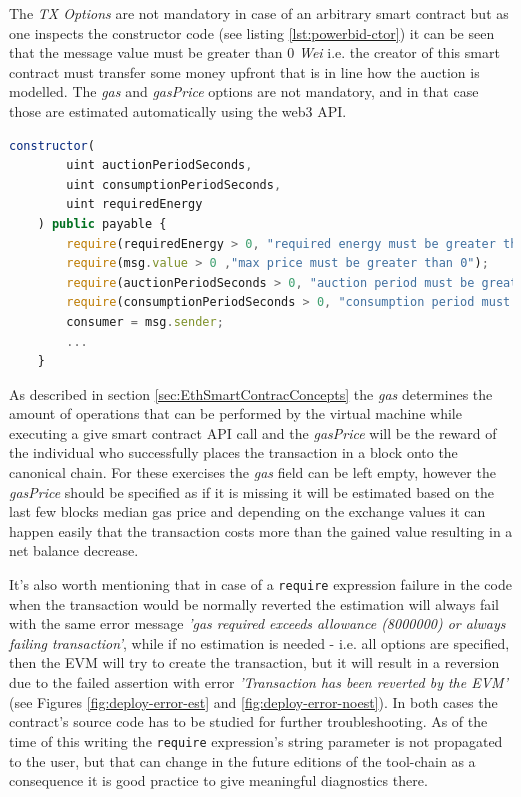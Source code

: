 \documentclass[a4paper]{article}
\begin{document}
The \emph{TX Options} are not mandatory in case of an arbitrary smart contract but as one inspects the constructor code (see listing \ref{lst:powerbid-ctor}) it can be seen that  the message value must be greater than 0 \emph{Wei} i.e. the creator of this smart contract must transfer some money upfront that is in line how the auction is modelled. The \emph{gas} and \emph{gasPrice} options are not mandatory, and in that case those are estimated automatically using the web3 API. 

\begin{lstlisting}[language=javascript,caption={Excerpt from the constructor of the Powerbid smart contract},label={lst:powerbid-ctor}]
    constructor(
        uint auctionPeriodSeconds,
        uint consumptionPeriodSeconds,
        uint requiredEnergy
    ) public payable {
        require(requiredEnergy > 0, "required energy must be greater than 0 wh");
        require(msg.value > 0 ,"max price must be greater than 0");
        require(auctionPeriodSeconds > 0, "auction period must be greater than 0");
        require(consumptionPeriodSeconds > 0, "consumption period must be greater than 0");
        consumer = msg.sender;
        ...
    }
\end{lstlisting}

As described in section \ref{sec:EthSmartContracConcepts} the \emph{gas} determines the amount of operations that can be performed by the virtual machine while executing a give smart contract API call and the \emph{gasPrice} will be the reward of the individual who successfully places the transaction in a block onto the canonical chain. For these exercises the \emph{gas} field can be left empty, however the \emph{gasPrice} should be specified as if it is missing it will be estimated based on the last few blocks median gas price and depending on the exchange values it can happen easily that the transaction costs more than the gained value resulting in a net balance decrease.

It's also worth mentioning that in case of a \verb!require! expression failure in the code when the transaction would be normally reverted the estimation will always fail with the same error message \emph{'gas required exceeds allowance (8000000) or always failing transaction'}, while if no estimation is needed - i.e. all options are specified, then the EVM will try to create the transaction, but it will result in a reversion due to the failed assertion with error \emph{'Transaction has been reverted by the EVM'} (see Figures \ref{fig:deploy-error-est} and \ref{fig:deploy-error-noest}). In both cases the contract's source code has to be studied for further troubleshooting. As of the time of this writing the \verb!require! expression's string parameter is not propagated to the user, but that can change in the future editions of the tool-chain as a consequence it is good practice to give meaningful diagnostics there.
\end{document}
